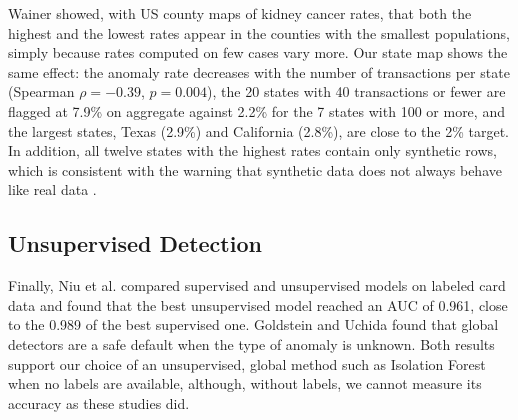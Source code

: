 \documentclass[journal]{IEEEtran}
\begin{document}
Wainer \cite{wainer2007dangerous} showed, with US county maps of kidney cancer rates, that both the highest and the lowest rates appear in the counties with the smallest populations, simply because rates computed on few cases vary more. Our state map shows the same effect: the anomaly rate decreases with the number of transactions per state (Spearman $\rho=-0.39$, $p=0.004$), the 20 states with 40 transactions or fewer are flagged at 7.9\% on aggregate against 2.2\% for the 7 states with 100 or more, and the largest states, Texas (2.9\%) and California (2.8\%), are close to the 2\% target. In addition, all twelve states with the highest rates contain only synthetic rows, which is consistent with the warning that synthetic data does not always behave like real data \cite{jordon2022synthetic}.

\subsection{Unsupervised Detection}

Finally, Niu et al. \cite{niu2019comparison} compared supervised and unsupervised models on labeled card data and found that the best unsupervised model reached an AUC of 0.961, close to the 0.989 of the best supervised one. Goldstein and Uchida \cite{goldstein2016comparative} found that global detectors are a safe default when the type of anomaly is unknown. Both results support our choice of an unsupervised, global method such as Isolation Forest when no labels are available, although, without labels, we cannot measure its accuracy as these studies did.
\end{document}
